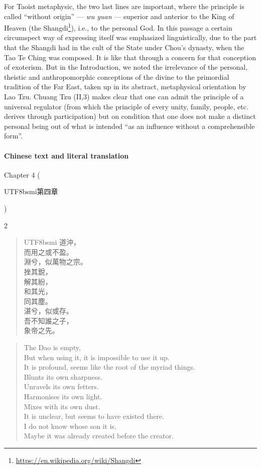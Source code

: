 For Taoist metaphysic, the two last lines are important, where the principle is called ``without origin'' --- \emph{wu yuan} --- superior and anterior to the King of Heaven (the Shangdi\footnote{\url{https://en.wikipedia.org/wiki/Shangdi}}), i.e., to the personal God. In this passage a certain circumspect way of expressing itself was emphasized linguistically, due to the part that the Shangdi had in the cult of the State under Chou's dynasty, when the Tao Te Ching was composed. It is like that through a concern for that conception of exoterism. But in the Introduction, we noted the irrelevance of the personal, theistic and anthropomorphic conceptions of the divine to the primordial tradition of the Far East, taken up in its abstract, metaphysical orientation by Lao Tzu. Chuang Tzu (II,3) makes clear that one can admit the principle of a universal regulator (from which the principle of every unity, family, people, etc. derives through participation) but on condition that one does not make a distinct personal being out of what is intended ``as an influence without a comprehensible form''.

\paragraph{Chinese text and literal translation}


Chapter 4 (\begin{CJK*}{UTF8}{bsmi}第四章\end{CJK*})
\begin{paracol}{2}
\begin{verse}
\begin{CJK*}{UTF8}{bsmi}
道沖，\\
而用之或不盈。\\ 淵兮，似萬物之宗。\\ 挫其銳，\\ 解其紛，\\ 和其光，\\ 同其塵。\\ 湛兮，似或存。\\ 吾不知誰之子，\\ 象帝之先。
\end{CJK*}
\end{verse}
\switchcolumn
\begin{verse}
The Dao is empty,\\ But when using it, it is impossible to use it up.\\ It is profound, seems like the root of the myriad things.\\ Blunts its own sharpness.\\ Unravels its own fetters.\\ Harmonises its own light.\\ Mixes with its own dust.\\ It is unclear, but seems to have existed there.\\ I do not know whose son it is,\\ Maybe it was already created before the creator.
\end{verse}
\end{paracol}


